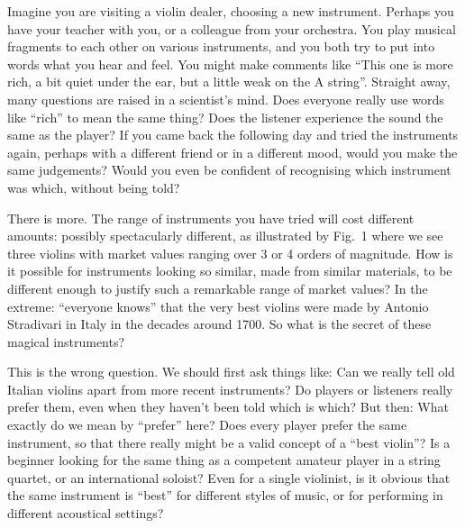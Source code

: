   Imagine you are visiting a violin dealer, choosing a new instrument. Perhaps 
  you have your teacher with you, or a colleague from your orchestra. You play 
  musical fragments to each other on various instruments, and you both try to 
  put into words what you hear and feel. You might make comments like ``This 
  one is more rich, a bit quiet under the ear, but a little weak on the A 
  string''. Straight away, many questions are raised in a scientist's mind. 
  Does everyone really use words like ``rich'' to mean the same thing? Does the 
  listener experience the sound the same as the player? If you came back the 
  following day and tried the instruments again, perhaps with a different 
  friend or in a different mood, would you make the same judgements? Would you 
  even be confident of recognising which instrument was which, without being 
  told? 

  There is more. The range of instruments you have tried will cost different 
  amounts: possibly spectacularly different, as illustrated by Fig.\ 1 where we 
  see three violins with market values ranging over 3 or 4 orders of magnitude. 
  How is it possible for instruments looking so similar, made from similar 
  materials, to be different enough to justify such a remarkable range of 
  market values? In the extreme: ``everyone knows'' that the very best violins 
  were made by Antonio Stradivari in Italy in the decades around 1700. So what 
  is the secret of these magical instruments? 

  This is the wrong question. We should first ask things like: Can we really 
  tell old Italian violins apart from more recent instruments? Do players or 
  listeners really prefer them, even when they haven't been told which is 
  which? But then: What exactly do we mean by ``prefer'' here? Does every 
  player prefer the same instrument, so that there really might be a valid 
  concept of a ``best violin''? Is a beginner looking for the same thing as a 
  competent amateur player in a string quartet, or an international soloist? 
  Even for a single violinist, is it obvious that the same instrument is 
  ``best'' for different styles of music, or for performing in different 
  acoustical settings? 


